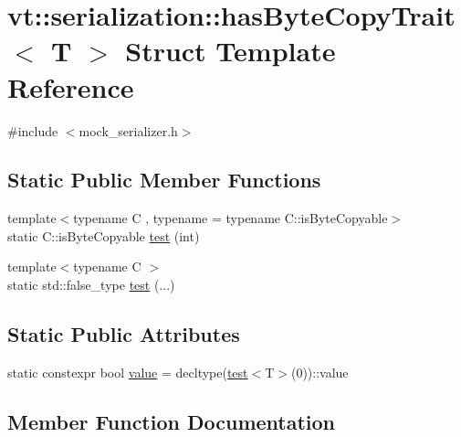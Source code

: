 \hypertarget{structvt_1_1serialization_1_1has_byte_copy_trait}{}\section{vt\+:\+:serialization\+:\+:has\+Byte\+Copy\+Trait$<$ T $>$ Struct Template Reference}
\label{structvt_1_1serialization_1_1has_byte_copy_trait}


{\ttfamily \#include $<$mock\+\_\+serializer.\+h$>$}

\subsection*{Static Public Member Functions}
\begin{DoxyCompactItemize}
\item 
{\footnotesize template$<$typename C , typename  = typename C\+::is\+Byte\+Copyable$>$ }\\static C\+::is\+Byte\+Copyable \hyperlink{structvt_1_1serialization_1_1has_byte_copy_trait_aff4ab3bf26b647e42f63359adeab1355}{test} (int)
\item 
{\footnotesize template$<$typename C $>$ }\\static std\+::false\+\_\+type \hyperlink{structvt_1_1serialization_1_1has_byte_copy_trait_a16ee865dfb170e91f41e16de170b835e}{test} (...)
\end{DoxyCompactItemize}
\subsection*{Static Public Attributes}
\begin{DoxyCompactItemize}
\item 
static constexpr bool \hyperlink{structvt_1_1serialization_1_1has_byte_copy_trait_ab0e433e90af4c3f2b8b6353fb2bbd34c}{value} = decltype(\hyperlink{structvt_1_1serialization_1_1has_byte_copy_trait_aff4ab3bf26b647e42f63359adeab1355}{test}$<$T$>$(0))\+::value
\end{DoxyCompactItemize}


\subsection{Member Function Documentation}
\mbox{\label{structvt_1_1serialization_1_1has_byte_copy_trait_aff4ab3bf26b647e42f63359adeab1355}} 
